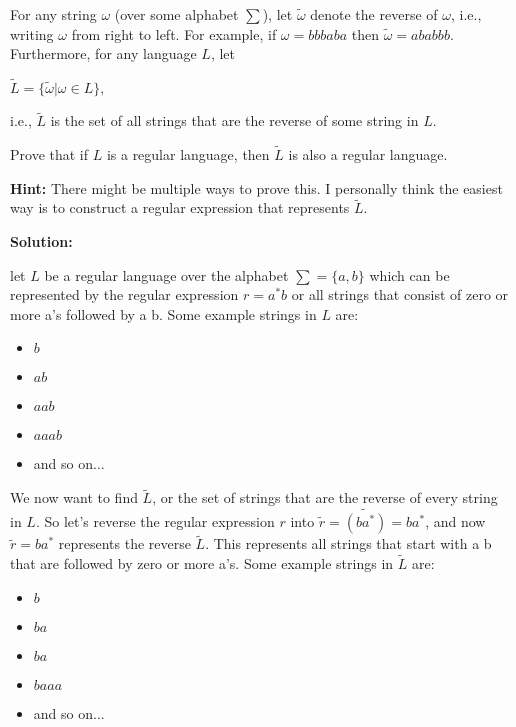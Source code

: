 \documentclass[11pt, letterpaper]{article}
\begin{document}
For any string $\omega$ (over some alphabet $\sum$), let $\tilde{\omega}$ denote the reverse of $\omega$, i.e., writing $\omega$ from right to left. For example, if $\omega = bbbaba$ then $\tilde{\omega} = ababbb$. Furthermore, for any language $L$, let

\vspace{5mm}

$\tilde{L} = \{\tilde{\omega}|\omega \in L\},$

\vspace{5mm}

\noindent i.e., $\tilde{L}$ is the set of all strings that are the reverse of some string in $L$.

\vspace{5mm}

\noindent Prove that if $L$ is a regular language, then $\tilde{L}$ is also a regular language.

\vspace{5mm}

\noindent \textbf{Hint:} There might be multiple ways to prove this. I personally think the easiest way is to construct a regular expression that represents $\tilde{L}$.

\vspace{5mm}

\noindent\textbf{Solution:}

\vspace{5mm}

\noindent let $L$ be a regular language over the alphabet $\sum = \{a, b\}$ which can be represented by the regular expression $r = a^*b$ or all strings that consist of zero or more a's followed by a b. Some example strings in $L$ are: 
\begin{itemize}
	\item $b$
	\item $ab$
	\item $aab$
	\item $aaab$
	\item and so on...
\end{itemize}

\noindent We now want to find $\tilde{L}$, or the set of strings that are the reverse of every string in $L$. So let's reverse the regular expression $r$ into $\tilde{r} = \tilde{(ba^*)} = ba^*$, and now $\tilde{r} = ba^*$ represents the reverse $\tilde{L}$. This represents all strings that start with a b that are followed by zero or more a's. Some example strings in $\tilde{L}$ are:
\begin{itemize}
	\item $b$
	\item $ba$
	\item $ba$
	\item $baaa$
	\item and so on...
\end{itemize}
\end{document}
